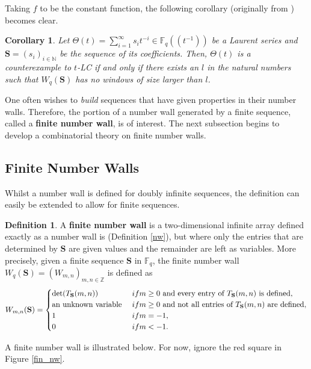 \documentclass{article}
\newtheorem{cor}[theorem]{Corollary}
\theoremstyle{definition}
\newtheorem{definition}[theorem]{Definition}
\newcommand{\F}{\mathbb{F}}
\newcommand{\Z}{\mathbb{Z}}
\numberwithin{equation}{subsection}
\begin{document}
\noindent Taking $f$ to be the constant function, the following corollary (originally from \cite{Faustin}) becomes clear. 
\begin{cor} \label{growcor}
Let $\Theta(t)=\sum^\infty_{i=1}s_it^{-i}\in\F_q\!\left(\!\left(t^{-1}\right)\!\right)$ be a Laurent series and $\mathbf{S}=(s_i)_{i\in\mathbb{N}}$ be the sequence of its coefficients. Then, $\Theta(t)$ is a counterexample to $t$-LC if and only if there exists an $l$ in the natural numbers such that $W_q(\textbf{S})$ has no windows of size larger than $l$.
\end{cor}
\noindent One often wishes to \textit{build} sequences that have given properties in their number walls. Therefore, the portion of a number wall generated by a finite sequence, called a \textbf{finite number wall}, is of interest. The next subsection begins to develop a combinatorial theory on finite number walls.
\subsection{Finite Number Walls}\label{Sect: 3.3}
\noindent Whilst a number wall is defined for doubly infinite sequences, the definition can easily be extended to allow for finite sequences. \begin{definition} \label{def: fin_nw}
     A \textbf{finite number wall} is a two-dimensional infinite array defined exactly as a number wall is (Definition \ref{nw}), but where only the entries that are determined by $\mathbf{S}$ are given values and the remainder are left as variables. More precisely, given a finite sequence $\mathbf{S}$ in $\F_q$, the finite number wall $W_q(\mathbf{S})=(W_{m,n})_{m,n\in\Z}$ is defined as \begin{equation*}
    W_{m,n}(\mathbf{S})=\begin{cases}\det(T_{\mathbf{S}}(m,n)) &\textup{ if } m\ge0 \text{ and every entry of }T_{\mathbf{S}}(m,n)\text{ is defined},\\
     \text{an unknown variable }&\textup{ if } m\ge0 \text{ and not all entries of }T_{\mathbf{S}}(m,n)\text{ are defined},\\
    1 & \textup{ if } m=-1,\\
    0 & \textup{ if } m<-1. \end{cases}
\end{equation*}  
\end{definition} \noindent A finite number wall is illustrated below. For now, ignore the red square in Figure \ref{fin_nw}.
\end{document}
